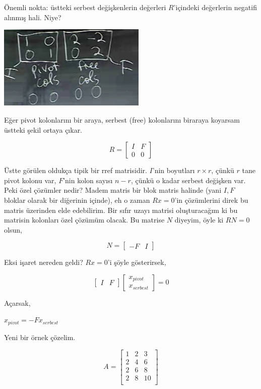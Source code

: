 \documentclass[12pt,fleqn]{article}\usepackage{../../common}
\begin{document}
Önemli nokta: üstteki serbest değişkenlerin değerleri $R$'içindeki
değerlerin negatifi alınmış hali. Niye?

\includegraphics[height=4cm]{7_01.png}

Eğer pivot kolonlarını bir araya, serbest (free) kolonlarını biraraya
koyarsam üstteki şekil ortaya çıkar. 

$$ R = 
\left[\begin{array}{cccc}
I & F   \\
0 & 0
\end{array}\right]
 $$

Üstte görülen oldukça tipik bir rref matrisidir. $I$'nin boyutları $r
\times r$, çünkü $r$ tane pivot kolonu var, $F$'nin kolon sayısı $n-r$,
çünkü o kadar serbest değişken var. Peki özel çözümler nedir? Madem matris
bir blok matris halinde (yani $I,F$ bloklar olarak bir diğerinin içinde),
eh o zaman $Rx = 0$'in çözümlerini direk bu matris üzerinden elde
edebilirim. Bir sıfır uzayı matrisi oluşturacağım ki bu matrisin kolonları
özel çözümüm olacak. Bu matrise $N$ diyeyim, öyle ki $RN = 0$ olsun,

$$ 
N = 
\left[\begin{array}{rr}
-F & I
\end{array}\right]
$$

Eksi işaret nereden geldi? $Rx=0$'i şöyle gösterirsek,

$$ 
\left[\begin{array}{rr}
I & F
\end{array}\right]
\left[\begin{array}{l}
x_{pivot} \\ x_{serbest} 
\end{array}\right] = 0
 $$

Açarsak, 

$x_{pivot} = -F x_{serbest}$

Yeni bir örnek çözelim. 

$$ 
A = \left[\begin{array}{rrr}
1 & 2 & 3 \\
2 & 4 & 6 \\
2 & 6 & 8 \\
2 & 8 & 10 \\
\end{array}\right]
 $$
\end{document}
